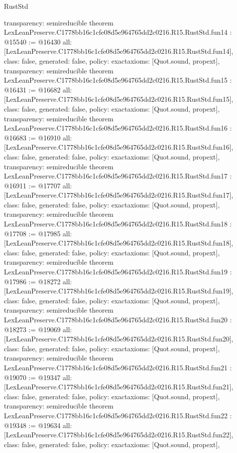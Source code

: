 \begin{lexlean}{RustStd}
\begin{coremodule}
{  transparency: semireducible
}
theorem LexLeanPreserve.C1778bb16c1cfe08d5e964765dd2c0216.R15.RustStd.fun14 : @15540 := @16430 {
  all: [LexLeanPreserve.C1778bb16c1cfe08d5e964765dd2c0216.R15.RustStd.fun14],
  class: false,
  generated: false,
  policy: exact{axioms: [Quot.sound, propext]},
  transparency: semireducible
}
theorem LexLeanPreserve.C1778bb16c1cfe08d5e964765dd2c0216.R15.RustStd.fun15 : @16431 := @16682 {
  all: [LexLeanPreserve.C1778bb16c1cfe08d5e964765dd2c0216.R15.RustStd.fun15],
  class: false,
  generated: false,
  policy: exact{axioms: [Quot.sound, propext]},
  transparency: semireducible
}
theorem LexLeanPreserve.C1778bb16c1cfe08d5e964765dd2c0216.R15.RustStd.fun16 : @16683 := @16910 {
  all: [LexLeanPreserve.C1778bb16c1cfe08d5e964765dd2c0216.R15.RustStd.fun16],
  class: false,
  generated: false,
  policy: exact{axioms: [Quot.sound, propext]},
  transparency: semireducible
}
theorem LexLeanPreserve.C1778bb16c1cfe08d5e964765dd2c0216.R15.RustStd.fun17 : @16911 := @17707 {
  all: [LexLeanPreserve.C1778bb16c1cfe08d5e964765dd2c0216.R15.RustStd.fun17],
  class: false,
  generated: false,
  policy: exact{axioms: [Quot.sound, propext]},
  transparency: semireducible
}
theorem LexLeanPreserve.C1778bb16c1cfe08d5e964765dd2c0216.R15.RustStd.fun18 : @17708 := @17985 {
  all: [LexLeanPreserve.C1778bb16c1cfe08d5e964765dd2c0216.R15.RustStd.fun18],
  class: false,
  generated: false,
  policy: exact{axioms: [Quot.sound, propext]},
  transparency: semireducible
}
theorem LexLeanPreserve.C1778bb16c1cfe08d5e964765dd2c0216.R15.RustStd.fun19 : @17986 := @18272 {
  all: [LexLeanPreserve.C1778bb16c1cfe08d5e964765dd2c0216.R15.RustStd.fun19],
  class: false,
  generated: false,
  policy: exact{axioms: [Quot.sound, propext]},
  transparency: semireducible
}
theorem LexLeanPreserve.C1778bb16c1cfe08d5e964765dd2c0216.R15.RustStd.fun20 : @18273 := @19069 {
  all: [LexLeanPreserve.C1778bb16c1cfe08d5e964765dd2c0216.R15.RustStd.fun20],
  class: false,
  generated: false,
  policy: exact{axioms: [Quot.sound, propext]},
  transparency: semireducible
}
theorem LexLeanPreserve.C1778bb16c1cfe08d5e964765dd2c0216.R15.RustStd.fun21 : @19070 := @19347 {
  all: [LexLeanPreserve.C1778bb16c1cfe08d5e964765dd2c0216.R15.RustStd.fun21],
  class: false,
  generated: false,
  policy: exact{axioms: [Quot.sound, propext]},
  transparency: semireducible
}
theorem LexLeanPreserve.C1778bb16c1cfe08d5e964765dd2c0216.R15.RustStd.fun22 : @19348 := @19634 {
  all: [LexLeanPreserve.C1778bb16c1cfe08d5e964765dd2c0216.R15.RustStd.fun22],
  class: false,
  generated: false,
  policy: exact{axioms: [Quot.sound, propext]},
}
\end{coremodule}
\end{lexlean}
